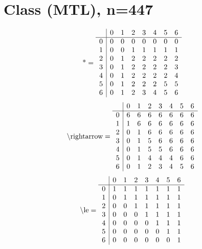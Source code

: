 \documentclass[11pt]{article}
\begin{document}
\section{Class (MTL), n=447}
\[\text{*} = 
\begin{array}{r | r r r r r r r}
 & 0 & 1 & 2 & 3 & 4 & 5 & 6 \\ \hline
0 & 0 & 0 & 0 & 0 & 0 & 0 & 0 \\
1 & 0 & 0 & 1 & 1 & 1 & 1 & 1 \\
2 & 0 & 1 & 2 & 2 & 2 & 2 & 2 \\
3 & 0 & 1 & 2 & 2 & 2 & 2 & 3 \\
4 & 0 & 1 & 2 & 2 & 2 & 2 & 4 \\
5 & 0 & 1 & 2 & 2 & 2 & 5 & 5 \\
6 & 0 & 1 & 2 & 3 & 4 & 5 & 6 \\
\end{array}
\]
\[\text{\textbackslash rightarrow} = 
\begin{array}{r | r r r r r r r}
 & 0 & 1 & 2 & 3 & 4 & 5 & 6 \\ \hline
0 & 6 & 6 & 6 & 6 & 6 & 6 & 6 \\
1 & 1 & 6 & 6 & 6 & 6 & 6 & 6 \\
2 & 0 & 1 & 6 & 6 & 6 & 6 & 6 \\
3 & 0 & 1 & 5 & 6 & 6 & 6 & 6 \\
4 & 0 & 1 & 5 & 5 & 6 & 6 & 6 \\
5 & 0 & 1 & 4 & 4 & 4 & 6 & 6 \\
6 & 0 & 1 & 2 & 3 & 4 & 5 & 6 \\
\end{array}
\]
\[\text{\textbackslash le} = 
\begin{array}{r | r r r r r r r}
 & 0 & 1 & 2 & 3 & 4 & 5 & 6 \\ \hline
0 & 1 & 1 & 1 & 1 & 1 & 1 & 1 \\
1 & 0 & 1 & 1 & 1 & 1 & 1 & 1 \\
2 & 0 & 0 & 1 & 1 & 1 & 1 & 1 \\
3 & 0 & 0 & 0 & 1 & 1 & 1 & 1 \\
4 & 0 & 0 & 0 & 0 & 1 & 1 & 1 \\
5 & 0 & 0 & 0 & 0 & 0 & 1 & 1 \\
6 & 0 & 0 & 0 & 0 & 0 & 0 & 1 \\
\end{array}
\]
\end{document}
